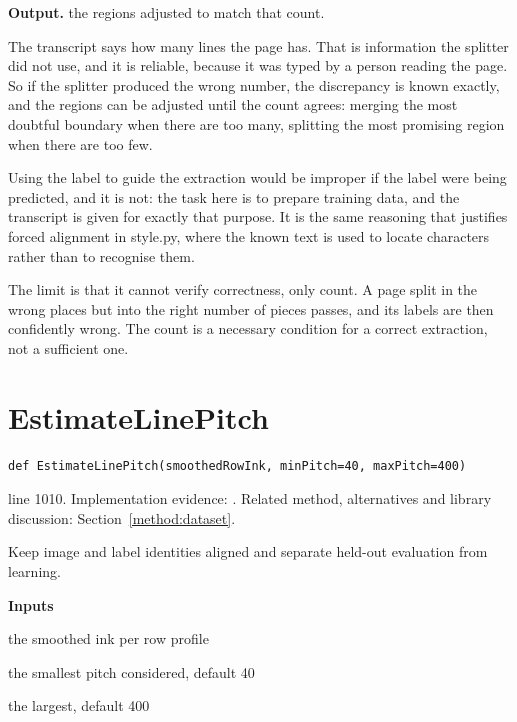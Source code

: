 \noindent\textbf{Output.} the regions adjusted to match that count.


The transcript says how many lines the page has. That is information the splitter did not use, and it is reliable, because it was typed by a person reading the page. So if the splitter produced the wrong number, the discrepancy is known exactly, and the regions can be adjusted until the count agrees: merging the most doubtful boundary when there are too many, splitting the most promising region when there are too few.


Using the label to guide the extraction would be improper if the label were being predicted, and it is not: the task here is to prepare training data, and the transcript is given for exactly that purpose. It is the same reasoning that justifies forced alignment in style.py, where the known text is used to locate characters rather than to recognise them.

The limit is that it cannot verify correctness, only count. A page split in the wrong places but into the right number of pieces passes, and its labels are then confidently wrong. The count is a necessary condition for a correct extraction, not a sufficient one.



\section{EstimateLinePitch}\label{fn:train:EstimateLinePitch}
\begin{lstlisting}[style=sig]
def EstimateLinePitch(smoothedRowInk, minPitch=40, maxPitch=400)
\end{lstlisting}
 line 1010. Implementation evidence: \cite{code2026}. Related method, alternatives and library discussion: Section~\ref{method:dataset}.


Keep image and label identities aligned and separate held-out evaluation from learning.




\noindent\textbf{Inputs}
\begin{description}[leftmargin=2.2em,style=nextline,font=\normalfont\ttfamily]\setlength\itemsep{1pt}
  \item[{smoothedRowInk}] \normalfont the smoothed ink per row profile
  \item[{minPitch}] \normalfont the smallest pitch considered, default 40
  \item[{maxPitch}] \normalfont the largest, default 400
\end{description}

